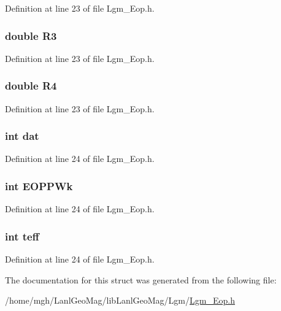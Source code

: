 Definition at line 23 of file Lgm\_\-Eop.h.\hypertarget{struct_lgm___nga_eopp_6752016f7a02ff6ff1b749623be15dbb}{
\subsubsection[{R3}]{\setlength{\rightskip}{0pt plus 5cm}double {\bf R3}}}
\label{struct_lgm___nga_eopp_6752016f7a02ff6ff1b749623be15dbb}




Definition at line 23 of file Lgm\_\-Eop.h.\hypertarget{struct_lgm___nga_eopp_f6474ec4ce3b123a435f2b0f453d0aba}{
\subsubsection[{R4}]{\setlength{\rightskip}{0pt plus 5cm}double {\bf R4}}}
\label{struct_lgm___nga_eopp_f6474ec4ce3b123a435f2b0f453d0aba}




Definition at line 23 of file Lgm\_\-Eop.h.\hypertarget{struct_lgm___nga_eopp_83c4f9536e205d6be81cfeef517a3ab2}{
\subsubsection[{dat}]{\setlength{\rightskip}{0pt plus 5cm}int {\bf dat}}}
\label{struct_lgm___nga_eopp_83c4f9536e205d6be81cfeef517a3ab2}




Definition at line 24 of file Lgm\_\-Eop.h.\hypertarget{struct_lgm___nga_eopp_7501e808549be41d41d0be07160bab87}{
\subsubsection[{EOPPWk}]{\setlength{\rightskip}{0pt plus 5cm}int {\bf EOPPWk}}}
\label{struct_lgm___nga_eopp_7501e808549be41d41d0be07160bab87}




Definition at line 24 of file Lgm\_\-Eop.h.\hypertarget{struct_lgm___nga_eopp_fb6dbc9814ae0e9f6a3147a5de51e70f}{
\subsubsection[{teff}]{\setlength{\rightskip}{0pt plus 5cm}int {\bf teff}}}
\label{struct_lgm___nga_eopp_fb6dbc9814ae0e9f6a3147a5de51e70f}




Definition at line 24 of file Lgm\_\-Eop.h.

The documentation for this struct was generated from the following file:\begin{CompactItemize}
\item 
/home/mgh/LanlGeoMag/libLanlGeoMag/Lgm/\hyperlink{_lgm___eop_8h}{Lgm\_\-Eop.h}\end{CompactItemize}
